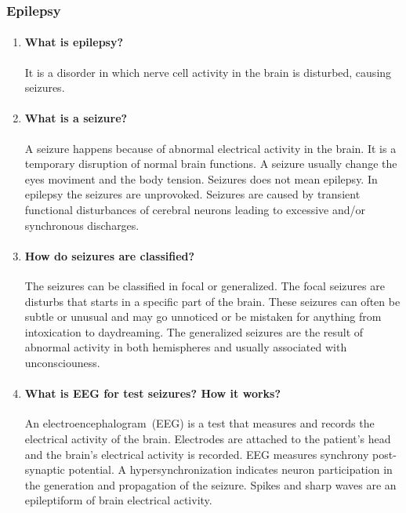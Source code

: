 \documentclass[12pt,article,oneside,a4paper]{memoir}
\begin{document}
\subsubsection{Epilepsy}
\begin{enumerate}

\item \paragraph{What is epilepsy?}
It is a disorder in which nerve cell activity in the brain is disturbed,
causing seizures.

\item \paragraph{What is a seizure?}
A seizure happens because of abnormal electrical activity in the brain. It is a
temporary disruption of normal brain functions. A seizure usually change the
eyes moviment and the body tension. Seizures does not mean epilepsy. In
epilepsy the seizures are unprovoked.
Seizures are caused by transient functional disturbances of cerebral neurons
leading to excessive and/or synchronous discharges.

\item \paragraph{How do seizures are classified?}
The seizures can be classified in focal or generalized.
The focal seizures are disturbs that starts in a specific part of the brain.
These seizures can often be subtle or unusual and may go unnoticed or be
mistaken for anything from intoxication to daydreaming.
The generalized seizures are the result of abnormal activity in both
hemispheres and usually associated with unconsciouness.

\item \paragraph{What is EEG for test seizures? How it works?}
An electroencephalogram~(EEG) is a test that measures and records the
electrical activity of the brain. Electrodes are attached to the patient's
head and the brain's electrical activity is recorded. EEG measures synchrony
post-synaptic potential. A hypersynchronization indicates neuron participation
in the generation and propagation of the seizure. Spikes and sharp waves are
an epileptiform of brain electrical activity.


\end{enumerate}
\end{document}

